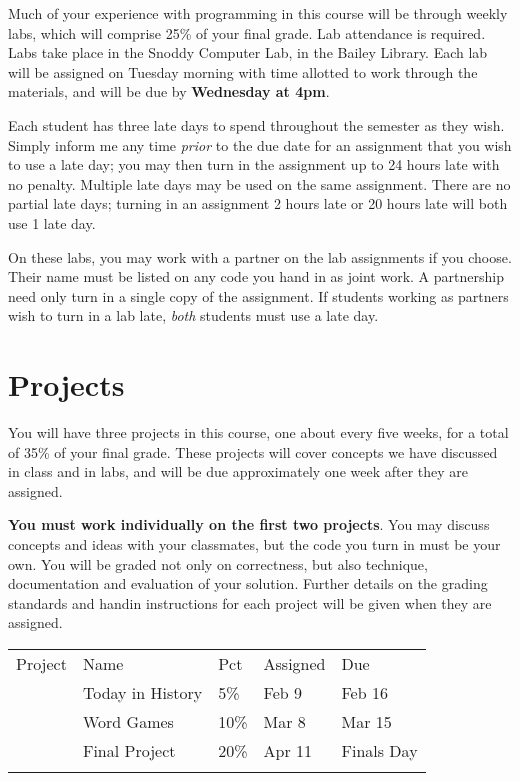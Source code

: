 \documentclass{article}
\begin{document}
Much of your experience with programming in this course will be
through weekly labs, which will comprise 25\% of your final grade. Lab
attendance is required. Labs take place in the Snoddy Computer Lab, in
the Bailey Library.  Each lab will be assigned on Tuesday morning
with time allotted to work through the materials, and will be due by
\textbf{Wednesday at 4pm}.

Each student has three late days to spend throughout the semester as
they wish.  Simply inform me any time \emph{prior} to the due date for an
assignment that you wish to use a late day; you may then turn in the
assignment up to 24 hours late with no penalty.  Multiple late days
may be used on the same assignment.  There are no partial late days;
turning in an assignment 2 hours late or 20 hours late will both use 1
late day.

On these labs, you may work with a partner on the lab assignments if
you choose. Their name must be listed on any code you hand in as joint
work.  A partnership need only turn in a single copy of the
assignment.  If students working as partners wish to turn in a lab
late, \emph{both} students must use a late day.

\section*{Projects}

You will have three projects in this course, one about every five weeks,
for a total of 35\% of your final grade. These projects will cover
concepts we have discussed in class and in labs, and will be due
approximately one week after they are assigned.

\textbf{You must work individually on the first two projects}. You may
discuss concepts and ideas with your classmates, but the code you turn
in must be your own. You will be graded not only on correctness, but
also technique, documentation and evaluation of your solution. Further
details on the grading standards and handin instructions for each
project will be given when they are assigned.

\begin{longtable}[c]{@{}lllll@{}}
\toprule\addlinespace
Project & Name & Pct & Assigned & Due
\\\addlinespace
\midrule\endhead
1 & Today in History & 5\% & Feb 9 & Feb
16
\\\addlinespace
2 & Word Games & 10\% & Mar 8 & Mar 15
\\\addlinespace
3 & Final Project & 20\% & Apr 11 & Finals Day
\\\addlinespace
\bottomrule
\end{longtable}
\end{document}
